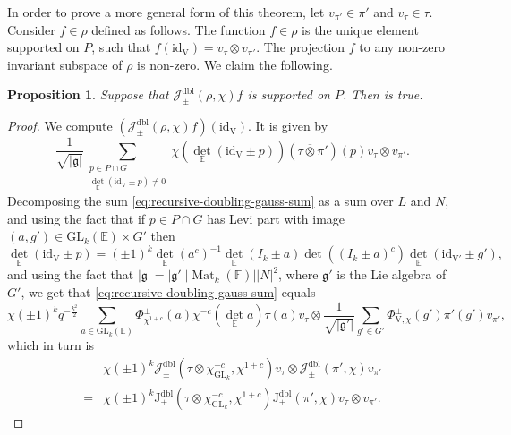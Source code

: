 \documentclass[12pt, reqno]{amsart}
\newtheorem{proposition}[theorem]{Proposition}
\theoremstyle{definition}
\theoremstyle{definition}
\theoremstyle{definition}
\newcommand{\detQuadratic}{{\det}_{\quadraticExtension}}
\newcommand{\idmap}{\mathrm{id}}
\newcommand{\sizeof}[1]{\left|#1\right|}
\newcommand{\hermitianSpace}{\mathrm{V}}
\newcommand{\involution}[1]{#1^{c}}
\newcommand{\minusInvolution}[1]{#1^{-c}}
\newcommand{\involutionPlusOne}[1]{#1^{1+c}}
\newcommand{\IdentityMatrix}[1]{I_{#1}}
\newcommand{\GL}{\mathrm{GL}}
\newcommand{\finiteField}{\mathbb{F}}
\newcommand{\quadraticExtension}{\mathbb{E}}
\newcommand{\squareMatrix}{\operatorname{Mat}}
\newcommand{\dblJacobiSum}[2]{\mathcal{J}_{\pm}^{\mathrm{dbl}}\left(#1, #2\right)}
\newcommand{\genJacobiKernel}[1]{\Phi^{\pm}_{#1}}
\newcommand{\genHermitianJacobiKernel}[2]{\Phi^{\pm}_{#1,#2}}
\newcommand{\dblJacobiSumScalar}[2]{\mathrm{J}_{\pm}^{\mathrm{dbl}}\left(#1, #2\right)}
\newcommand{\lieAlgebra}{\mathfrak{g}}
\begin{document}
In order to prove a more general form of this theorem, let $v_{\pi'} \in \pi'$ and $v_{\tau} \in \tau$. Consider $f \in \rho$ defined as follows. The function $f \in \rho$ is the unique element supported on $P$, such that $f\left(\idmap_{\hermitianSpace}\right) = v_{\tau} \otimes v_{\pi'}$. The projection $f$ to any non-zero invariant subspace of $\rho$ is non-zero. We claim the following.
\begin{proposition}\label{prop:multiplicativity-of-jacobi-sum-given-support}
	Suppose that $\dblJacobiSum{\rho}{\chi} f$ is supported on $P$. Then  is true.
\end{proposition}
\begin{proof}
	We compute $\left(\dblJacobiSum{\rho}{\chi} f\right)\left(\idmap_{\hermitianSpace}\right)$. It is given by
	\begin{equation}\label{eq:recursive-doubling-gauss-sum}
		\frac{1}{\sqrt{\sizeof{\lieAlgebra}}} \sum_{\substack{p \in P \cap G\\
				\detQuadratic\left(\idmap_{\hermitianSpace}\pm p\right) \ne 0}} \chi\left(\detQuadratic\left(\idmap_{\hermitianSpace} \pm p\right)\right) \left(\tau \overline{\otimes} \pi'\right)\left(p\right) v_{\tau} \otimes v_{\pi'}.
	\end{equation}
	Decomposing the sum \eqref{eq:recursive-doubling-gauss-sum} as a sum over $L$ and $N$, and using the fact that if $p \in P \cap G$ has Levi part with image $\left(a, g'\right) \in \GL_k\left(\quadraticExtension\right) \times G'$ then $$\detQuadratic\left(\idmap_{\hermitianSpace} \pm p\right) = \left(\pm 1\right)^k \detQuadratic\left(\involution{a}\right)^{-1}\detQuadratic\left(\IdentityMatrix{k} \pm a\right) \det\left(\involution{\left(\IdentityMatrix{k} \pm a\right)}\right) \detQuadratic\left(\idmap_{\hermitianSpace'} \pm g'\right),$$
	and using the fact that $\sizeof{\lieAlgebra} = \sizeof{\lieAlgebra'} \sizeof{\squareMatrix_k\left(\finiteField\right)} \sizeof{N}^2$, where $\lieAlgebra'$ is the Lie algebra of $G'$,
	we get that \eqref{eq:recursive-doubling-gauss-sum} equals
	\begin{equation}
		\chi\left(\pm 1\right)^k q^{-\frac{k^2}{2}} \sum_{a \in \GL_k\left(\quadraticExtension\right)} \genJacobiKernel{\involutionPlusOne{\chi}}\left(a\right) \minusInvolution{\chi}\left(\detQuadratic a\right) \tau\left(a\right) v_{\tau} \otimes \frac{1}{\sqrt{\sizeof{\lieAlgebra'}}} \sum_{g' \in G'} \genHermitianJacobiKernel{\hermitianSpace}{\chi}\left(g'\right) \pi'\left(g'\right) v_{\pi'},
	\end{equation}
	which in turn is
	\begin{align*}
		&\chi\left(\pm 1\right)^k \dblJacobiSum{\tau \otimes \minusInvolution{\chi_{\GL_k}}}{\involutionPlusOne{\chi}} v_{\tau} \otimes \dblJacobiSum{\pi'}{\chi} v_{\pi'}\\
		=& \chi\left(\pm 1\right)^k\dblJacobiSumScalar{\tau \otimes \minusInvolution{\chi_{\GL_k}}}{\involutionPlusOne{\chi}} \dblJacobiSumScalar{\pi'}{\chi} v_{\tau} \otimes v_{\pi'}.
	\end{align*}
	

\end{proof}
\end{document}
